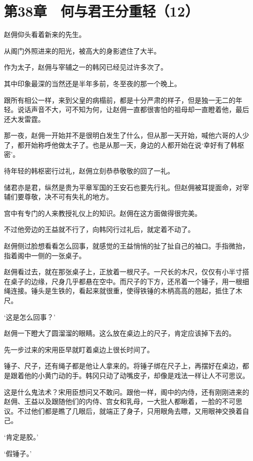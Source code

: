 \section{第38章　何与君王分重轻（12）}

赵佣仰头看着新来的先生。

从阁门外照进来的阳光，被高大的身影遮住了大半。

作为太子，赵佣与宰辅之一的韩冈已经见过许多次了。

其中印象最深的当然还是半年多前，冬至夜的那一个晚上。

跟所有相公一样，来到父皇的病榻前，都是十分严肃的样子，但是独一无二的年轻。说话声音不大，可不知为何，让赵佣一直都很害怕的祖母却一直瞪着他，最后还大发雷霆。

那一夜，赵佣一开始并不是很明白发生了什么，但从那一天开始，喊他六哥的人少了，都开始称呼他做太子了。也是从那一天，身边的人都开始在说‘幸好有了韩枢密’。

待年轻的韩枢密行过礼，赵佣立刻恭恭敬敬的回了一礼。

储君亦是君，纵然是贵为平章军国的王安石也要先行礼。但赵佣被耳提面命，对宰辅们要尊敬，决不可有失礼的地方。

宫中有专门的人来教授礼仪上的知识。赵佣在这方面做得很完美。

不过他旁边的王益就不行了，向韩冈行过礼后，就定着不动了。

赵佣侧过脸想看看怎么回事，就感觉的王益悄悄的扯了扯自己的袖口。手指微抬，指着阁中一侧的一张桌子。

赵佣看过去，就在那张桌子上，正放着一根尺子。一尺长的木尺，仅仅有小半寸搭在桌子的边缘，尺身几乎都悬在空中。而尺子的下方，还吊着一个锤子，用一根细绳连接。锤头是生铁的，看起来就很重，使得铁锤的木柄高高的翘起，抵住了木尺。

‘这是怎么回事？’

赵佣一下瞪大了圆溜溜的眼睛。这么放在桌边上的尺子，肯定应该掉下去的。

先一步过来的宋用臣早就盯着桌边上很长时间了。

锤子、尺子，还有绳子都是他让人拿来的。将锤子绑在尺子上，再摆好在桌边，都是跟着他的小黄门动的手。韩冈只动了动嘴皮子，却像是戏法一样让人不可思议。

这是什么鬼法术？宋用臣想问又不敢问。跟他一样，阁中的内侍，还有刚刚进来的赵佣、王益以及跟随他们的内侍、宫女和乳母，一大批人都瞅着，一脸的不可思议。不过他们都是瞧了几眼后，就端正了身子，只用眼角去瞟，又用眼神交换着自己。

‘肯定是胶。’

‘假锤子。’


